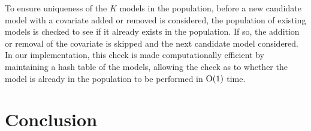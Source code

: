 To ensure uniqueness of the $K$ models in the population, before a new candidate model with a covariate added
or removed is considered, the population of existing models is checked to see if it already exists in the
population. If so, the addition or removal of the covariate is skipped and the next candidate model considered.
In our implementation, this check is made computationally efficient by maintaining a hash table of the models,
allowing the check as to whether the model is already in the population to be performed in $\text{O}(1)$ time.

\section{Conclusion}
